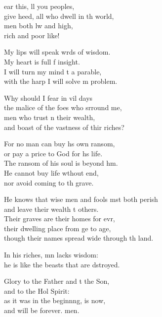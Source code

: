 \settowidth{\versewidth}{He knows that wise men and fools must both perish *}
\begin{psalmverse}%
  \begin{patverse}
ear this, ll you peoples,\Med\\
give heed, all who dwell in th world,\\
men both lw and high,\Med\\
rich and poor like!

My lips will speak wrds of wisdom.\Med\\
My heart is full f insight.\\
I will turn my mind t a parable,\Med\\
with the harp I will solve m problem.

Why should I fear in vil days\Med\\
the malice of the foes who srround me,\\
men who trust \pointup{\i}n their wealth,\Med\\
and boast of the vastness of thir riches?

For no man can buy h\pointup{\i}s own ransom,\Med\\
or pay a price to God for h\pointup{\i}s life.\\
The ransom of his soul is beyond h\pointup{\i}m.\Flex\\
He cannot buy life w\pointup{\i}thout end,\Med\\
nor avoid coming to th grave.

He knows that wise men and fools mst both perish\Med\\
and leave their wealth t others.\\
Their graves are their homes for evr,\Flex\\
their dwelling place from ge to age,\Med\\
though their names spread wide through th land.

In his riches, mn lacks wisdom:\Med\\
he is like the beasts that are dstroyed.

Glory to the Father and t the Son,\Med\\
and to the Hol Spirit:\\
as it was in the beginn\pointup{\i}ng, is now,\Med\\
and will be forever. men. 
  \end{patverse}
\end{psalmverse}
